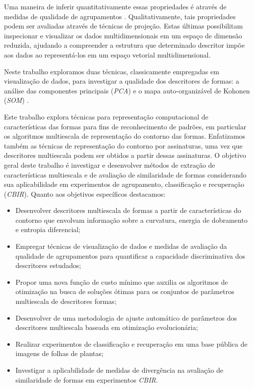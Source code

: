 Uma maneira de inferir quantitativamente essas propriedades é através de medidas de qualidade de agrupamentos \cite{Meta:2009}. Qualitativamente, tais propriedades podem ser avaliadas através de técnicas de projeção. Estas últimas possibilitam inspecionar e visualizar os dados multidimensionais em um espaço de dimensão reduzida, ajudando a compreender a estrutura que determinado descritor impõe aos dados ao representá-los em um espaço vetorial multidimensional.

Neste trabalho exploramos duas técnicas, classicamente empregadas em visualização de dados, para investigar a qualidade dos descritores de formas: a análise das componentes principais (\emph{PCA}) e o mapa auto-organizável de Kohonen (\textit{SOM}) \cite{Kohonen:1982}.   

Este trabalho explora técnicas para representação computacional de características das formas para fins de reconhecimento de padrões, em particular os algoritmos multiescala de representação do contorno das formas.  Enfatizamos também as técnicas de representação do contorno por assinaturas, uma vez que descritores multiescala podem ser obtidos a partir dessas assinaturas. 
O objetivo geral deste trabalho é investigar e desenvolver métodos de extração de características multiescala e de avaliação de similaridade de formas considerando sua aplicabilidade em experimentos de agrupamento, classificação e recuperação (\emph{CBIR}). Quanto aos objetivos específicos destacamos:

\begin{itemize}
\item Desenvolver descritores multiescala de formas a partir de características do contorno que envolvam informação sobre a curvatura, energia de dobramento e entropia diferencial;

\item Empregar técnicas de visualização de dados e medidas de avaliação da qualidade de agrupamentos para quantificar a capacidade discriminativa dos descritores estudados; 


\item Propor uma nova função de custo mínimo que auxilia os algoritmos de otimização na busca de soluções ótimas para os conjuntos de parâmetros multiescala de descritores formas;

\item Desenvolver de uma metodologia de ajuste automático de parâmetros dos descritores multiescala baseada em otimização evolucionária;

\item Realizar experimentos de classificação e recuperação em uma base pública de imagens de folhas de plantas;

\item Investigar a aplicabilidade de medidas de divergência na avaliação de similaridade de formas em experimentos \emph{CBIR}.
\end{itemize}


